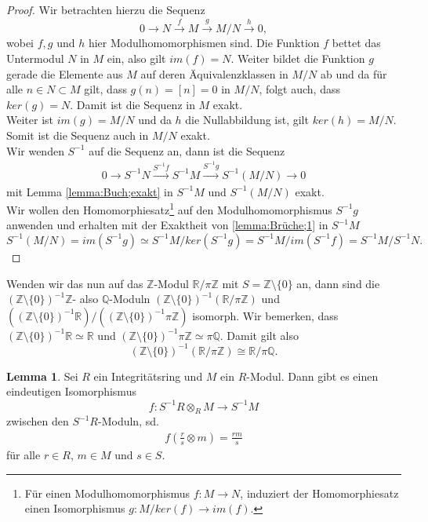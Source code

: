 \documentclass[11pt,titlepage]{article}
\newcommand{\setZ}{\mathbb{Z}}
\newcommand{\setQ}{\mathbb{Q}}
\newcommand{\setR}{\mathbb{R}}
\theoremstyle{definition}
\newtheorem{lemma}[theorem]{Lemma}
\theoremstyle{remark}
\begin{document}
	\begin{proof}
		Wir betrachten hierzu die Sequenz
		\[0\to N\xrightarrow{f} M\xrightarrow{g} M/N\xrightarrow{h} 0,\]
		wobei $f,g$ und $h$ hier Modulhomomorphismen sind. Die Funktion 
		$f$ bettet das Untermodul $N$ in $M$ ein, also gilt 
		$im(f)=N$. Weiter bildet die Funktion $g$ gerade die Elemente aus $M$ 
		auf deren Äquivalenzklassen in $M/N$ ab und da für alle $n\in N\subset M$ 
		gilt, dass $g(n)=[n]=0$ in $M/N$, folgt auch, dass $ker(g)=N$. Damit 
		ist die Sequenz in $M$ exakt. \\
		Weiter ist $im(g)=M/N$ und da $h$ die Nullabbildung ist, gilt $ker(h)=M/N$. 
		Somit ist die Sequenz auch in $M/N$ exakt. \\
		Wir wenden $S^{-1}$ auf die Sequenz an, dann ist die Sequenz
		\begin{align}
			0\to S^{-1}N \xrightarrow{S^{-1}f} S^{-1}M \xrightarrow{S^{-1}g}
			S^{-1}(M/N)\to 0 \label{lemma:Brüche;1}
		\end{align}
		mit Lemma \ref{lemma:Buch;exakt} in $S^{-1}M$ und $S^{-1}(M/N)$ exakt. \\
		Wir wollen den Homomorphiesatz\footnote{Für einen Modulhomomorphismus 
		$f:M\to N$, induziert der Homomorphiesatz einen Isomorphismus 
		$g:M/ker(f)\to im(f)$.} auf den Modulhomomorphismus 
		$S^{-1}g$ anwenden und erhalten mit der Exaktheit von \ref{lemma:Brüche;1} 
		in $S^{-1}M$
		\[ S^{-1}(M/N)=im(S^{-1}g)\simeq S^{-1}M/ker(S^{-1}g) =S^{-1}M/im(S^{-1}f)=S^{-1}M/S^{-1}N.\]
	\end{proof}
	
	Wenden wir das nun auf das $\setZ$-Modul $\setR /\pi\setZ$ mit 
	$S=\setZ\setminus\{0\}$ an, dann sind die $(\setZ\setminus\{0\})^{-1}\setZ$- also $\setQ$-Moduln 
	$(\setZ\setminus\{0\})^{-1}(\setR /\pi\setZ)$ und 
	$\left((\setZ\setminus\{0\})^{-1}\setR\right) /\left((\setZ\setminus\{0\})^{-1}\pi\setZ\right)$ 
	isomorph. Wir bemerken, dass $(\setZ\setminus\{0\})^{-1}\setR\simeq\setR$ und 
	$(\setZ\setminus\{0\})^{-1}\pi\setZ\simeq\pi\setQ$. Damit gilt also 
	\[ (\setZ\setminus\{0\})^{-1}(\setR /\pi\setZ)\cong \setR/\pi\setQ.\]
	
	\begin{lemma} \label{lemma:lociso}
		Sei $R$ ein Integritätsring und $M$ ein $R$-Modul. Dann gibt es einen 
		eindeutigen Isomorphismus
		\[f:S^{-1}R\otimes_R M\to S^{-1}M\]
		zwischen den $S^{-1}R$-Moduln, sd.
		\begin{align}
			f\left(\frac{r}{s}\otimes m\right)=\frac{rm}{s} \label{lemma:lociso;1}
		\end{align}
		für alle $r\in R$, $m\in M$ und $s\in S$.
	\end{lemma}
	
\end{document}
